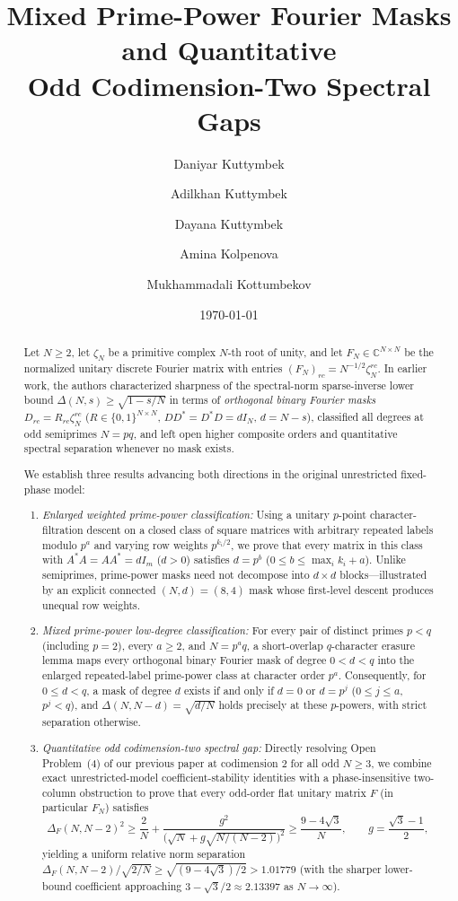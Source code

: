 \documentclass[11pt,reqno]{amsart}
\title[Mixed Prime-Power Masks and Odd Codimension-Two Gaps]{Mixed Prime-Power Fourier Masks and Quantitative\\Odd Codimension-Two Spectral Gaps}
\author[D. Kuttymbek]{Daniyar Kuttymbek}
\author[A. Kuttymbek]{Adilkhan Kuttymbek}
\author[D. Kuttymbek]{Dayana Kuttymbek}
\author[A. Kolpenova]{Amina Kolpenova}
\author[M. Kottumbekov]{Mukhammadali Kottumbekov}
\date{\today}
\numberwithin{equation}{section}
\theoremstyle{definition}
\theoremstyle{remark}
\newcommand{\C}{\mathbb{C}}
\begin{document}
\begin{abstract}
Let $N\ge 2$, let $\zeta_N$ be a primitive complex $N$-th root of unity, and let $F_N\in\C^{N\times N}$ be the normalized unitary discrete Fourier matrix with entries $(F_N)_{rc}=N^{-1/2}\zeta_N^{rc}$. In earlier work, the authors characterized sharpness of the spectral-norm sparse-inverse lower bound $\Delta(N,s)\ge\sqrt{1-s/N}$ in terms of \emph{orthogonal binary Fourier masks} $D_{rc}=R_{rc}\zeta_N^{rc}$ ($R\in\{0,1\}^{N\times N}$, $DD^*=D^*D=dI_N$, $d=N-s$), classified all degrees at odd semiprimes $N=pq$, and left open higher composite orders and quantitative spectral separation whenever no mask exists.

We establish three results advancing both directions in the original unrestricted fixed-phase model:
\begin{enumerate}[label=(\arabic*),leftmargin=1.8em]
\item \emph{Enlarged weighted prime-power classification:} Using a unitary $p$-point character-filtration descent on a closed class of square matrices with arbitrary repeated labels modulo $p^a$ and varying row weights $p^{k_i/2}$, we prove that every matrix in this class with $A^*A=AA^*=dI_m$ ($d>0$) satisfies $d=p^b$ ($0\le b\le \max_i k_i+a$). Unlike semiprimes, prime-power masks need not decompose into $d\times d$ blocks---illustrated by an explicit connected $(N,d)=(8,4)$ mask whose first-level descent produces unequal row weights.
\item \emph{Mixed prime-power low-degree classification:} For every pair of distinct primes $p<q$ (including $p=2$), every $a\ge 2$, and $N=p^a q$, a short-overlap $q$-character erasure lemma maps every orthogonal binary Fourier mask of degree $0<d<q$ into the enlarged repeated-label prime-power class at character order $p^a$. Consequently, for $0\le d<q$, a mask of degree $d$ exists if and only if $d=0$ or $d=p^j$ ($0\le j\le a$, $p^j<q$), and $\Delta(N,N-d)=\sqrt{d/N}$ holds precisely at these $p$-powers, with strict separation otherwise.
\item \emph{Quantitative odd codimension-two spectral gap:} Directly resolving Open Problem~(4) of our previous paper at codimension $2$ for all odd $N\ge 3$, we combine exact unrestricted-model coefficient-stability identities with a phase-insensitive two-column obstruction to prove that every odd-order flat unitary matrix $F$ (in particular $F_N$) satisfies
\[
\Delta_F(N,N-2)^2
\ge \frac{2}{N} + \frac{g^2}{\bigl(\sqrt{N}+g\sqrt{N/(N-2)}\bigr)^2}
\ge \frac{9-4\sqrt{3}}{N},
\qquad g=\frac{\sqrt{3}-1}{2},
\]
yielding a uniform relative norm separation $\Delta_F(N,N-2)/\sqrt{2/N}\ge \sqrt{(9-4\sqrt{3})/2}>1.01779$ (with the sharper lower-bound coefficient approaching $3-\sqrt{3}/2\approx 2.13397$ as $N\to\infty$).
\end{enumerate}
\end{abstract}
\end{document}
